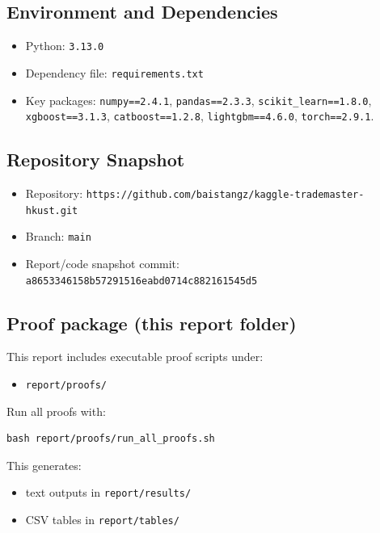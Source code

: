 \subsection{Environment and Dependencies}
\begin{itemize}[leftmargin=1.5em]
  \item Python: \texttt{3.13.0}
  \item Dependency file: \texttt{requirements.txt}
  \item Key packages: \texttt{numpy==2.4.1}, \texttt{pandas==2.3.3}, \texttt{scikit\_learn==1.8.0}, \texttt{xgboost==3.1.3}, \texttt{catboost==1.2.8}, \texttt{lightgbm==4.6.0}, \texttt{torch==2.9.1}.
\end{itemize}

\subsection{Repository Snapshot}
\begin{itemize}[leftmargin=1.5em]
  \item Repository: \texttt{https://github.com/baistangz/kaggle-trademaster-hkust.git}
  \item Branch: \texttt{main}
  \item Report/code snapshot commit: \texttt{a8653346158b57291516eabd0714c882161545d5}
\end{itemize}

\subsection{Proof package (this report folder)}
This report includes executable proof scripts under:
\begin{itemize}[leftmargin=1.5em]
  \item \texttt{report/proofs/}
\end{itemize}

Run all proofs with:
\begin{Verbatim}[fontsize=\small]
bash report/proofs/run_all_proofs.sh
\end{Verbatim}

This generates:
\begin{itemize}[leftmargin=1.5em]
  \item text outputs in \texttt{report/results/}
  \item CSV tables in \texttt{report/tables/}
\end{itemize}

